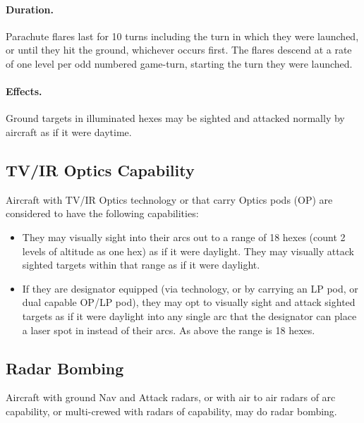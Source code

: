 \begin{advancedrules}
\paragraph{Duration.} Parachute flares last for 10 turns including the turn in which they were launched, or until they hit the ground, whichever occurs first. The flares descend at a rate of one level per odd numbered game-turn, starting the turn they were launched.

\paragraph{Effects.} Ground targets in illuminated hexes may be sighted and attacked normally by aircraft as if it were daytime.

\subsection{TV/IR Optics Capability}

Aircraft with TV/IR Optics technology or that carry Optics pods (OP) are considered to have the following capabilities:

\begin{itemize}

    \item They may visually sight into their  arcs out to a range of 18 hexes (count 2 levels of altitude as one hex) as if it were daylight. They may visually attack sighted targets within that range as if it were daylight. 

    \item If they are designator equipped (via technology, or by carrying an LP pod, or dual capable OP/LP pod), they may opt to visually sight and attack sighted targets as if it were daylight into any single arc that the designator can place a laser spot in instead of their  arcs. As above the range is 18 hexes.

\end{itemize}

\subsection{Radar Bombing}

Aircraft with ground Nav and Attack radars, or with air to air radars of  arc capability, or multi-crewed with radars of  capability, may do radar bombing.


\end{advancedrules}
